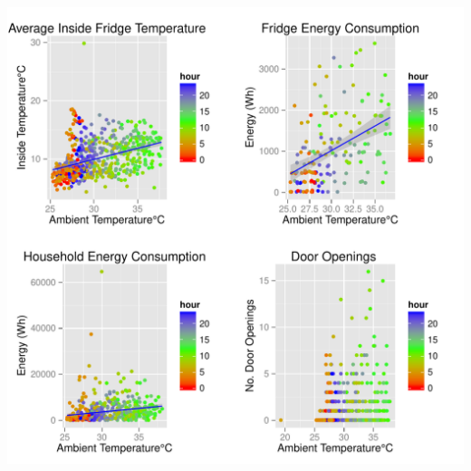 \documentclass[11pt]{article}\usepackage[]{graphicx}\usepackage[]{color}
\makeatletter
\def\maxwidth{ %
  \ifdim\Gin@nat@width>\linewidth
    \linewidth
  \else
    \Gin@nat@width
  \fi
}
\newenvironment{knitrout}{}{} %
\makeatother
\begin{document}
\begin{knitrout}
\color{fgcolor}

\includegraphics[width=\maxwidth]{figure/correlationplots-1} \hfill{}



\end{knitrout}
    
      
\end{document}
